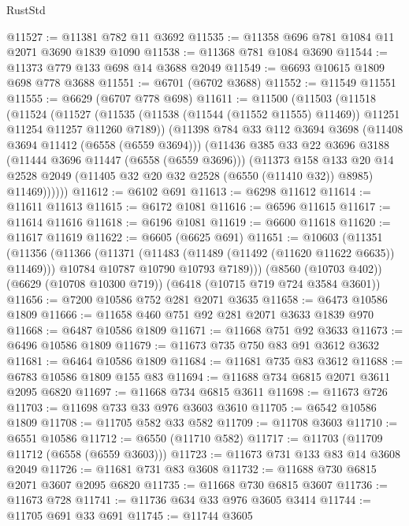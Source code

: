 \begin{lexlean}{RustStd}
\begin{coremodule}
@11527 := @11381 @782 @11 @3692
@11535 := @11358 @696 @781 @1084 @11 @2071 @3690 @1839 @1090
@11538 := @11368 @781 @1084 @3690
@11544 := @11373 @779 @133 @698 @14 @3688 @2049
@11549 := @6693 @10615 @1809 @698 @778 @3688
@11551 := @6701 (@6702 @3688)
@11552 := @11549 @11551
@11555 := @6629 (@6707 @778 @698)
@11611 := @11500
    (@11503
      (@11518
        (@11524
          (@11527
            (@11535 (@11538 (@11544 (@11552 @11555) @11469)) @11251 @11254 @11257 @11260 @7189))
          (@11398
            @784
            @33
            @112
            @3694
            @3698
            (@11408 @3694 @11412 (@6558 (@6559 @3694)))
            (@11436
              @385
              @33
              @22
              @3696
              @3188
              (@11444 @3696 @11447 (@6558 (@6559 @3696)))
              (@11373
                @158
                @133
                @20
                @14
                @2528
                @2049
                (@11405 @32 @20 @32 @2528 (@6550 (@11410 @32)) @8985)
                @11469))))))
@11612 := @6102 @691
@11613 := @6298 @11612
@11614 := @11611 @11613
@11615 := @6172 @1081
@11616 := @6596 @11615
@11617 := @11614 @11616
@11618 := @6196 @1081
@11619 := @6600 @11618
@11620 := @11617 @11619
@11622 := @6605 (@6625 @691)
@11651 := @10603
    (@11351
      (@11356
        (@11366
          (@11371 (@11483 (@11489 (@11492 (@11620 @11622 @6635)) @11469)))
          @10784
          @10787
          @10790
          @10793
          @7189)))
    (@8560 (@10703 @402))
    (@6629 (@10708 @10300 @719))
    (@6418 (@10715 @719 @724 @3584 @3601))
@11656 := @7200 @10586 @752 @281 @2071 @3635
@11658 := @6473 @10586 @1809
@11666 := @11658 @460 @751 @92 @281 @2071 @3633 @1839 @970
@11668 := @6487 @10586 @1809
@11671 := @11668 @751 @92 @3633
@11673 := @6496 @10586 @1809
@11679 := @11673 @735 @750 @83 @91 @3612 @3632
@11681 := @6464 @10586 @1809
@11684 := @11681 @735 @83 @3612
@11688 := @6783 @10586 @1809 @155 @83
@11694 := @11688 @734 @6815 @2071 @3611 @2095 @6820
@11697 := @11668 @734 @6815 @3611
@11698 := @11673 @726
@11703 := @11698 @733 @33 @976 @3603 @3610
@11705 := @6542 @10586 @1809
@11708 := @11705 @582 @33 @582
@11709 := @11708 @3603
@11710 := @6551 @10586
@11712 := @6550 (@11710 @582)
@11717 := @11703 (@11709 @11712 (@6558 (@6559 @3603)))
@11723 := @11673 @731 @133 @83 @14 @3608 @2049
@11726 := @11681 @731 @83 @3608
@11732 := @11688 @730 @6815 @2071 @3607 @2095 @6820
@11735 := @11668 @730 @6815 @3607
@11736 := @11673 @728
@11741 := @11736 @634 @33 @976 @3605 @3414
@11744 := @11705 @691 @33 @691
@11745 := @11744 @3605

\end{coremodule}
\end{lexlean}

